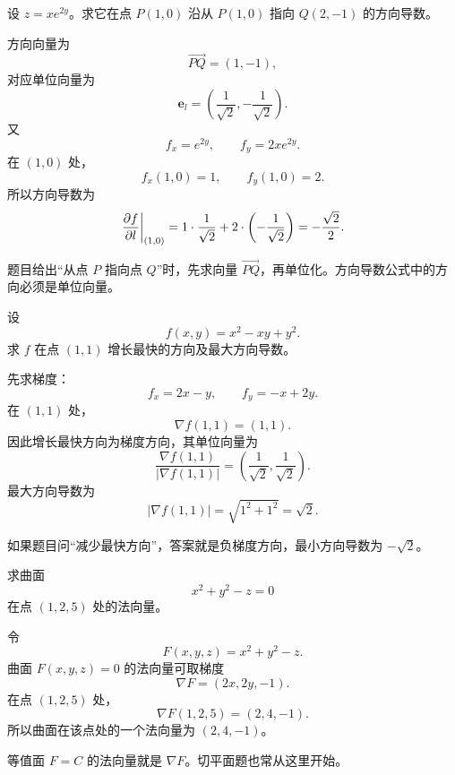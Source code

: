 \begin{center}
\end{center}
\begin{problem}
设 $z=xe^{2y}$。求它在点 $P(1,0)$ 沿从 $P(1,0)$ 指向 $Q(2,-1)$ 的方向导数。
\end{problem}
\begin{solution}
方向向量为
\[
  \overrightarrow{PQ}=(1,-1),
\]
对应单位向量为
\[
  \bm e_l=\left(\frac1{\sqrt2},-\frac1{\sqrt2}\right).
\]
又
\[
  f_x=e^{2y},\qquad f_y=2xe^{2y}.
\]
在 $(1,0)$ 处，
\[
  f_x(1,0)=1,\qquad f_y(1,0)=2.
\]
所以方向导数为
\[
  \left.\frac{\partial f}{\partial l}\right|_{(1,0)}
  =1\cdot\frac1{\sqrt2}+2\cdot\left(-\frac1{\sqrt2}\right)
  =-\frac{\sqrt2}{2}.
\]
\end{solution}
\begin{note}
题目给出“从点 $P$ 指向点 $Q$”时，先求向量 $\overrightarrow{PQ}$，再单位化。方向导数公式中的方向必须是单位向量。
\end{note}

\begin{problem}
设
\[
  f(x,y)=x^2-xy+y^2.
\]
求 $f$ 在点 $(1,1)$ 增长最快的方向及最大方向导数。
\end{problem}
\begin{solution}
先求梯度：
\[
  f_x=2x-y,\qquad f_y=-x+2y.
\]
在 $(1,1)$ 处，
\[
  \nabla f(1,1)=(1,1).
\]
因此增长最快方向为梯度方向，其单位向量为
\[
  \frac{\nabla f(1,1)}{|\nabla f(1,1)|}
  =\left(\frac1{\sqrt2},\frac1{\sqrt2}\right).
\]
最大方向导数为
\[
  |\nabla f(1,1)|=\sqrt{1^2+1^2}=\sqrt2.
\]
\end{solution}
\begin{note}
如果题目问“减少最快方向”，答案就是负梯度方向，最小方向导数为 $-\sqrt2$。
\end{note}

\begin{problem}
求曲面
\[
  x^2+y^2-z=0
\]
在点 $(1,2,5)$ 处的法向量。
\end{problem}
\begin{solution}
令
\[
  F(x,y,z)=x^2+y^2-z.
\]
曲面 $F(x,y,z)=0$ 的法向量可取梯度
\[
  \nabla F=(2x,2y,-1).
\]
在点 $(1,2,5)$ 处，
\[
  \nabla F(1,2,5)=(2,4,-1).
\]
所以曲面在该点处的一个法向量为 $(2,4,-1)$。
\end{solution}
\begin{note}
等值面 $F=C$ 的法向量就是 $\nabla F$。切平面题也常从这里开始。
\end{note}

